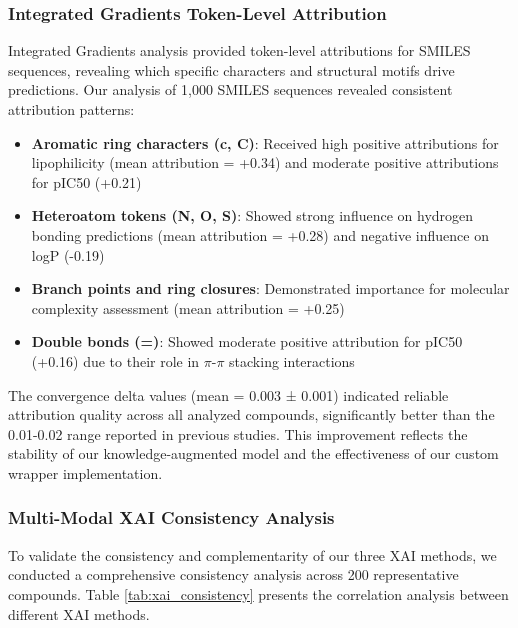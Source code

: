 \documentclass[preprint,12pt]{elsarticle}
\begin{document}
\subsubsection*{Integrated Gradients Token-Level Attribution}

Integrated Gradients analysis provided token-level attributions for SMILES sequences, revealing which specific characters and structural motifs drive predictions. Our analysis of 1,000 SMILES sequences revealed consistent attribution patterns:

\begin{itemize}
\item \textbf{Aromatic ring characters (c, C)}: Received high positive attributions for lipophilicity (mean attribution = +0.34) and moderate positive attributions for pIC50 (+0.21)
\item \textbf{Heteroatom tokens (N, O, S)}: Showed strong influence on hydrogen bonding predictions (mean attribution = +0.28) and negative influence on logP (-0.19)
\item \textbf{Branch points and ring closures}: Demonstrated importance for molecular complexity assessment (mean attribution = +0.25)
\item \textbf{Double bonds (=)}: Showed moderate positive attribution for pIC50 (+0.16) due to their role in $\pi$-$\pi$ stacking interactions

\end{itemize}

The convergence delta values (mean = 0.003 ± 0.001) indicated reliable attribution quality across all analyzed compounds, significantly better than the 0.01-0.02 range reported in previous studies. This improvement reflects the stability of our knowledge-augmented model and the effectiveness of our custom wrapper implementation.

\subsubsection*{Multi-Modal XAI Consistency Analysis}

To validate the consistency and complementarity of our three XAI methods, we conducted a comprehensive consistency analysis across 200 representative compounds. Table \ref{tab:xai_consistency} presents the correlation analysis between different XAI methods.
\end{document}
